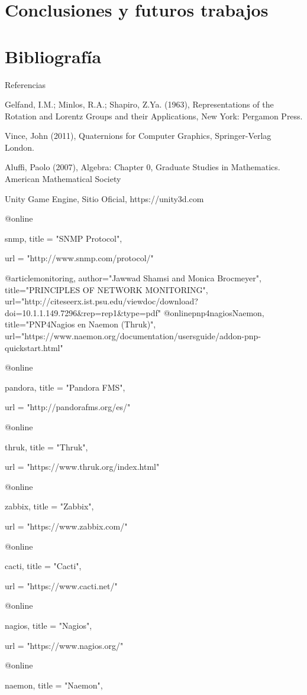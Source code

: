 \documentclass{beamer}
\theoremstyle{plain}
\theoremstyle{definition}
\theoremstyle{plain}
\theoremstyle{definition}
\theoremstyle{remark}
\theoremstyle{definition}
\begin{document}
\section{Conclusiones y futuros trabajos}
\section{Bibliografía}
\begin{frame}{Referencias}
	
	\begin{thebibliography}{9}
		
		Gelfand, I.M.; Minlos, R.A.; Shapiro, Z.Ya. (1963),
		Representations of the Rotation and Lorentz Groups and their Applications,
		New York: Pergamon Press.
		
		Vince, John (2011),
		Quaternions for Computer Graphics,
		Springer-Verlag London.
		
		Aluffi, Paolo (2007),
		Algebra: Chapter 0,
		Graduate Studies in Mathematics. American Mathematical Society
		
		Unity Game Engine,
		Sitio Oficial,
		https://unity3d.com
		
		@online{snmp,
			title  = "SNMP Protocol",
			
			url    = "http://www.snmp.com/protocol/"
		}
		
		@article{monitoring,
			author="Jawwad Shamsi and Monica Brocmeyer",
			title="PRINCIPLES OF NETWORK MONITORING",
			url="http://citeseerx.ist.psu.edu/viewdoc/download?doi=10.1.1.149.7296&rep=rep1&type=pdf"
		}
		@online{pnp4nagiosNaemon,
			title="PNP4Nagios en Naemon (Thruk)",
			url="https://www.naemon.org/documentation/usersguide/addon-pnp-quickstart.html"}
		
		@online{pandora,
			title  = "Pandora FMS",
			
			url    = "http://pandorafms.org/es/"
		}
		@online{thruk,
			title  = "Thruk",
			
			url    = "https://www.thruk.org/index.html"
		}
		@online{zabbix,
			title  = "Zabbix",
			
			url    = "https://www.zabbix.com/"
		}
		
		@online{cacti,
			title  = "Cacti",
			
			url    = "https://www.cacti.net/"
		}
		@online{nagios,
			title  = "Nagios",
			
			url    = "https://www.nagios.org/"
		}
		@online{naemon,
			title  = "Naemon",
			
}
\end{thebibliography}
\end{frame}
\end{document}
